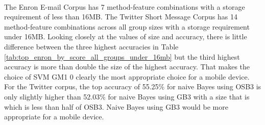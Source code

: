 \paragraph*{} The Enron E-mail Corpus has 7 method-feature combinations with a storage requirement of less than 16MB. The Twitter Short Message Corpus has 14 method-feature combinations across all group sizes with a storage requirement under 16MB.  Looking closely at the values of size and accuracy, there is little difference between the three highest accuracies in Table \ref{tab:top_enron_by_score_all_groups_under_16mb} but the third highest accuracy is more than double the size of the highest accuracy.  That makes the choice of SVM GM1 0 clearly the most appropriate choice for a mobile device. For the Twitter corpus, the top accuracy of 55.25\% for naive Bayes using OSB3 is only slightly higher than 52.03\% for naive Bayes using GB3 with a size that is which is less than half of OSB3.  Naive Bayes using GB3 would be more appropriate for a mobile device.

